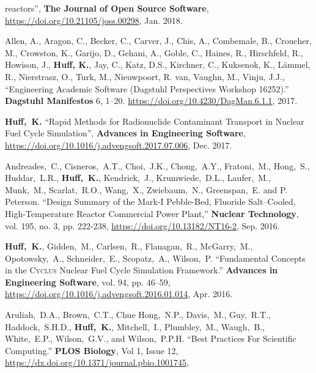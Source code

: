 \documentclass[margin,line]{resume}
\newcommand{\Cyclus}{\textsc{Cyclus}\xspace}%
\begin{document}
\begin{resume}
\begin{bibenum}
               reactors'',  \textbf{The Journal of Open Source Software},
               \url{https://doi.org/10.21105/joss.00298}, Jan. 2018.
      \item Allen, A., Aragon, C., Becker, C., Carver, J., Chis, A., Combemale,
              B., Croucher, M., Crowston, K., Garijo, D., Gehani, A., Goble,
              C., Haines, R., Hirschfeld, R., Howison, J., \textbf{Huff, K.},
              Jay, C., Katz, D.S., Kirchner, C., Kuksenok, K., L\"{a}mmel, R.,
              Nierstrasz, O., Turk, M., Nieuwpoort, R. van, Vaughn, M., Vinju,
              J.J., ``Engineering Academic Software (Dagstuhl Perspectives
              Workshop 16252).'' \textbf{Dagstuhl Manifestos} 6, 1–20.
              \url{https://doi.org/10.4230/DagMan.6.1.1}, 2017.
       \item \textbf{Huff,~K.} ``Rapid Methods for Radionuclide Contaminant
               Transport in Nuclear Fuel Cycle Simulation'', \textbf{Advances
               in Engineering Software},
               \url{https://doi.org/10.1016/j.advengsoft.2017.07.006}, Dec. 2017.
      \item Andreades,~C., Cisneros,~A.T., Choi,~J.K., Chong,~A.Y.,
              Fratoni,~M., Hong,~S., Huddar,~L.R., \textbf{Huff,~K.}, Kendrick,~J.,
              Krumwiede,~D.L., Laufer,~M., Munk,~M., Scarlat,~R.O., Wang,~X.,
              Zwiebaum,~N., Greenspan,~E. and P. Peterson.  ``Design Summary of
              the Mark-I Pebble-Bed, Fluoride Salt–Cooled, High-Temperature
              Reactor Commercial Power Plant,'' \textbf{Nuclear Technology},
              vol. 195, no. 3, pp. 222-238,
              \url{https://doi.org/10.13182/NT16-2},
              Sep. 2016.
       \item \textbf{Huff,~K.}, Gidden,~M., Carlsen,~R., Flanagan,~R.,
               McGarry,~M., Opotowsky,~A., Schneider,~E., Scopatz,~A.,
               Wilson,~P.  ``Fundamental Concepts in the \Cyclus Nuclear Fuel
               Cycle Simulation Framework.'' \textbf{Advances in Engineering
               Software}, vol. 94, pp. 46–59,
               \url{https://doi.org/10.1016/j.advengsoft.2016.01.014},
               Apr. 2016.
       \item Aruliah,~D.A., Brown,~C.T., Chue Hong,~N.P., Davis,~M., Guy,~R.T.,
               Haddock,~S.H.D., \textbf{Huff,~K.}, Mitchell,~I., Plumbley,~M.,
               Waugh,~B., White,~E.P., Wilson,~G.V., and Wilson,~P.P.H.  ``Best
               Practices For Scientific Computing.'' \textbf{PLOS Biology}, Vol
               1, Issue 12, \url{https://dx.doi.org/10.1371/journal.pbio.1001745},

\end{bibenum}
\end{resume}
\end{document}
